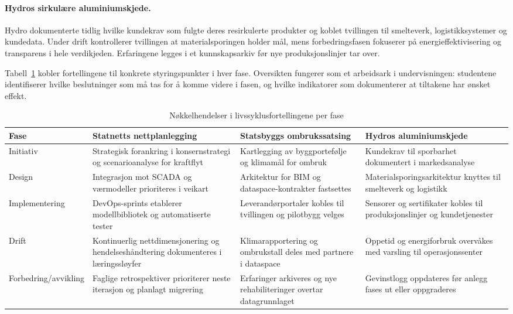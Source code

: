 \paragraph{Hydros sirkulære aluminiumskjede.} Hydro dokumenterte tidlig hvilke kundekrav som fulgte deres resirkulerte produkter og koblet tvillingen til smelteverk, logistikksystemer og kundedata. Under drift kontrollerer tvillingen at materialsporingen holder mål, mens forbedringsfasen fokuserer på energieffektivisering og transparens i hele verdikjeden. Erfaringene legges i et kunnskapsarkiv før nye produksjonslinjer tar over.\citep{hydro2023traceability}

Tabell~\ref{tab:livssyklusfortellinger} kobler fortellingene til konkrete styringspunkter i hver fase. Oversikten fungerer som et arbeidsark i undervisningen: studentene identifiserer hvilke beslutninger som må tas for å komme videre i fasen, og hvilke indikatorer som dokumenterer at tiltakene har ønsket effekt.

\begin{table}[h]
    \centering
    \caption{Nøkkelhendelser i livssyklusfortellingene per fase}
    \label{tab:livssyklusfortellinger}
    \begin{tabular}{p{2.7cm}p{3.6cm}p{3.6cm}p{3.6cm}}
        \toprule
        Fase & Statnetts nettplanlegging & Statsbyggs ombrukssatsing & Hydros aluminiumskjede \\
        \midrule
        Initiativ & Strategisk forankring i konsernstrategi og scenarioanalyse for kraftflyt & Kartlegging av byggportefølje og klimamål for ombruk & Kundekrav til sporbarhet dokumentert i markedsanalyse \\
        Design & Integrasjon mot SCADA og værmodeller prioriteres i veikart & Arkitektur for BIM og dataspace-kontrakter fastsettes & Materialsporingsarkitektur knyttes til smelteverk og logistikk \\
        Implementering & DevOps-sprints etablerer modellbibliotek og automatiserte tester & Leverandørportaler kobles til tvillingen og pilotbygg velges & Sensorer og sertifikater kobles til produksjonslinjer og kundetjenester \\
        Drift & Kontinuerlig nettdimensjonering og hendelseshåndtering dokumenteres i læringssløyfer & Klimarapportering og ombrukstall deles med partnere i dataspace & Oppetid og energiforbruk overvåkes med varsling til operasjonssenter \\
        Forbedring/avvikling & Faglige retrospektiver prioriterer neste iterasjon og planlagt migrering & Erfaringer arkiveres og nye rehabiliteringer overtar datagrunnlaget & Gevinstlogg oppdateres før anlegg fases ut eller oppgraderes \\
        \bottomrule
    \end{tabular}
\end{table}

